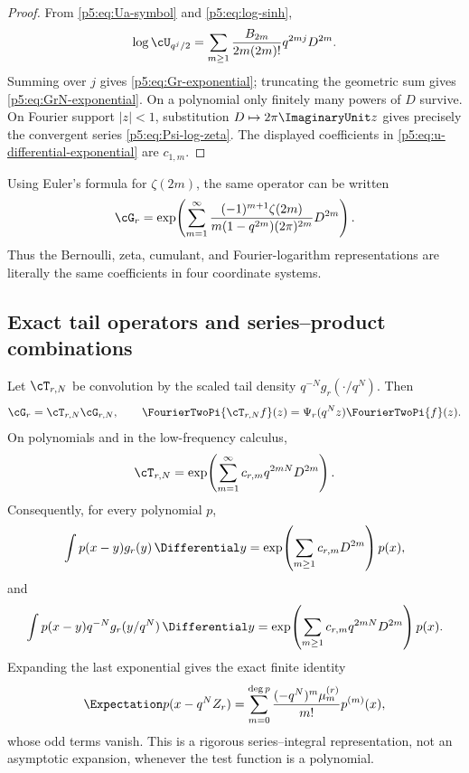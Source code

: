 \documentclass[11pt]{article}
\theoremstyle{definition}
\theoremstyle{remark}
\begin{document}
\begin{proof}
From \eqref{p5:eq:Ua-symbol} and \eqref{p5:eq:log-sinh},
\[
 \log\cU_{q^j/2}
 =\sum_{m\ge1}\frac{B_{2m}}{2m(2m)!}q^{2mj}D^{2m}.
\]
Summing over $j$ gives \eqref{p5:eq:Gr-exponential}; truncating the geometric sum
gives \eqref{p5:eq:GrN-exponential}.  On a polynomial only finitely many
powers of $D$ survive.  On Fourier support $|z|<1$, substitution
$D\mapsto2\pi\ImaginaryUnit z$ gives precisely the convergent series
\eqref{p5:eq:Psi-log-zeta}.  The displayed coefficients in
\eqref{p5:eq:u-differential-exponential} are $c_{1,m}$.
\end{proof}

Using Euler's formula for $\zeta(2m)$, the same operator can be written
\begin{equation}
 \cG_r
 =\exp\!\left(
   \sum_{m=1}^{\infty}
   \frac{(-1)^{m+1}\zeta(2m)}{m(1-q^{2m})(2\pi)^{2m}}
   D^{2m}\right).                                        \label{p5:eq:Gr-zeta-operator}
\end{equation}
Thus the Bernoulli, zeta, cumulant, and Fourier-logarithm representations are
literally the same coefficients in four coordinate systems.

\subsection{Exact tail operators and series--product combinations}

Let $\cT_{r,N}$ be convolution by the scaled tail density
$q^{-N}g_r(\cdot/q^N)$.  Then
\begin{equation}
 \cG_r=\cT_{r,N}\cG_{r,N},
 \qquad
 \FourierTwoPi{\cT_{r,N}f}(z)=\Psi_r(q^Nz)\FourierTwoPi{f}(z).       \label{p5:eq:tail-operator-factor}
\end{equation}
On polynomials and in the low-frequency calculus,
\begin{equation}
 \cT_{r,N}
 =\exp\!\left(\sum_{m=1}^{\infty}c_{r,m}q^{2mN}D^{2m}\right). \label{p5:eq:tail-exponential}
\end{equation}
Consequently, for every polynomial $p$,
\begin{equation}
 \int p(x-y)g_r(y)\,\Differential y
 =\exp\!\left(\sum_{m\ge1}c_{r,m}D^{2m}\right)p(x),       \label{p5:eq:polynomial-exact-operator}
\end{equation}
and
\begin{equation}
 \int p(x-y)q^{-N}g_r(y/q^N)\,\Differential y
 =\exp\!\left(\sum_{m\ge1}c_{r,m}q^{2mN}D^{2m}\right)p(x). \label{p5:eq:tail-polynomial-operator}
\end{equation}
Expanding the last exponential gives the exact finite identity
\begin{equation}
 \Expectation p(x-q^NZ_r)
 =\sum_{m=0}^{\deg p}\frac{(-q^N)^m\mu_m^{(r)}}{m!}p^{(m)}(x), \label{p5:eq:tail-Taylor-polynomial}
\end{equation}
whose odd terms vanish.  This is a rigorous series--integral representation,
not an asymptotic expansion, whenever the test function is a polynomial.
\end{document}
